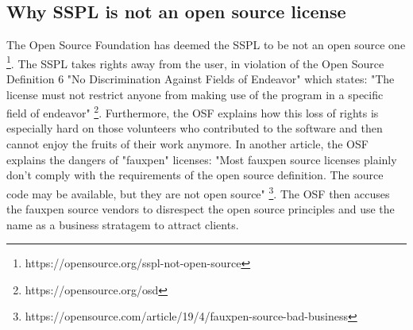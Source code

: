 \documentclass[12pt, a4paper]{article}
\begin{document}
  
  \pagebreak
  \subsection{Why SSPL is not an open source license}
  The Open Source Foundation has deemed the SSPL to be not an open source one \footnote{https://opensource.org/sspl-not-open-source}. The SSPL takes rights away from the user, in violation of the Open Source Definition 6 "No Discrimination Against Fields of Endeavor" which states: "The license must not restrict anyone from making use of the program in a specific field of endeavor" \footnote{https://opensource.org/osd}. Furthermore, the OSF explains how this loss of rights is especially hard on those volunteers who contributed to the software and then cannot enjoy the fruits of their work anymore. In another article, the OSF explains the dangers of "fauxpen" licenses: "Most fauxpen source licenses plainly don't comply with the requirements of the open source definition. The source code may be available, but they are not open source" \footnote{https://opensource.com/article/19/4/fauxpen-source-bad-business}. The OSF then accuses the fauxpen source vendors to disrespect the open source principles and use the name as a business stratagem to attract clients.
\end{document}
